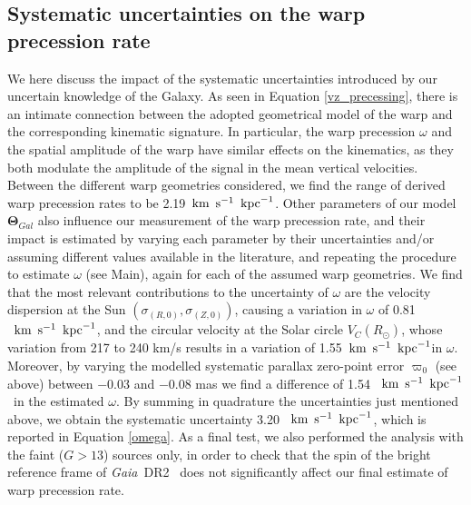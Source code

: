 \documentclass{nature}
\newcommand{\gdrtwo}{\textit{Gaia}~DR2}
\newcommand{\kmskpc}{$\text{\, km} \text{\, s}^{-1} \text{\, kpc}^{-1}$}
\begin{document}
\begin{methods}

\subsection{Systematic uncertainties on the warp precession rate}
We here discuss the impact of the systematic uncertainties introduced by our uncertain knowledge of the Galaxy. As seen in Equation \ref{vz_precessing}, there is an intimate connection between the adopted geometrical model of the warp and the corresponding kinematic signature. In particular, the warp precession $\omega$ and the spatial amplitude of the warp have similar effects on the kinematics, as they both modulate the amplitude of the signal in the mean vertical velocities. Between the different warp geometries considered, we find the range of derived warp precession rates to be 2.19\kmskpc. Other parameters of our model $\boldsymbol{\Theta}_{Gal}$ also influence our measurement of the warp precession rate, and their impact is estimated by varying each parameter by their uncertainties and/or assuming different values available in the literature, and repeating the procedure to estimate $\omega$ (see Main), again for each of the assumed warp geometries. We find that the most relevant contributions to the uncertainty of $\omega$ are the velocity dispersion at the Sun\cite{BlandGerhard:2016} $(\sigma_{(R,0)},\sigma_{(Z,0)})$, causing a variation in $\omega$ of 0.81\kmskpc, and the circular velocity at the Solar circle $V_C (R_{\odot})$, whose variation from 217\cite{Wegg:2019} to 240\cite{Reid:2014} km/s results in a variation of 1.55\kmskpc in $\omega$. Moreover, by varying the modelled systematic parallax zero-point error $\varpi_{0}$ (see above) between $-0.03$ and $-0.08$ mas we find a difference of 1.54 \kmskpc\ in the estimated $\omega$. By summing in quadrature the uncertainties just mentioned above, we obtain the systematic uncertainty 3.20 \kmskpc, which is reported in Equation \ref{omega}. As a final test, we also performed the analysis with the faint ($G>13$) sources only, in order to check that the spin of the bright reference frame of \gdrtwo\ \cite{Lindegren:2020} does not significantly affect our final estimate of warp precession rate.


\end{methods}
\end{document}
